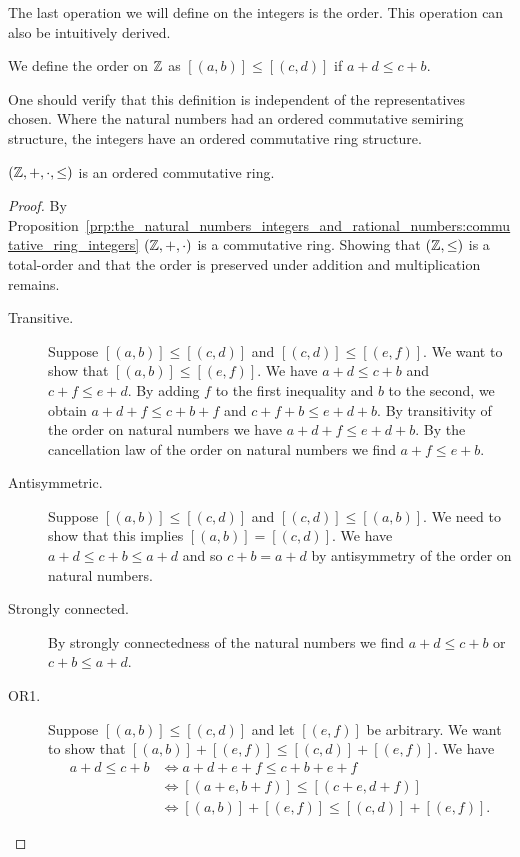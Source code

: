 \documentclass[../main.tex]{subfiles}
\begin{document}
The last operation we will define on the integers is the order. This operation can also be intuitively derived.
\begin{definition}
    We define the order on $\mathbb{Z}$ as $[(a,b)]\leq[(c,d)]$ if $a+d\leq c+b$.
\end{definition}
One should verify that this definition is independent of the representatives chosen. Where the natural numbers had an ordered commutative semiring structure, the integers have an ordered commutative ring structure.
\begin{proposition}\label{prp:the_natural_numbers_integers_and_rational_numbers:ordered_commutative_ring_integers}
    $(\mathbb{Z},+,\cdot,\leq)$ is an ordered commutative ring.
\end{proposition}
\begin{proof}
    By Proposition~\ref{prp:the_natural_numbers_integers_and_rational_numbers:commutative_ring_integers} $(\mathbb{Z},+,\cdot)$ is a commutative ring. Showing that $(\mathbb{Z},\leq)$ is a total-order and that the order is preserved under addition and multiplication remains.
    \begin{description}
        \item[Transitive.] Suppose $[(a,b)]\leq[(c,d)]$ and $[(c,d)]\leq[(e,f)]$. We want to show that $[(a,b)]\leq[(e,f)]$. We have $a+d\leq c+b$ and $c+f\leq e+d$. By adding $f$ to the first inequality and $b$ to the second, we obtain $a+d+f\leq c+b+f$ and $c+f+b\leq e+d+b$. By transitivity of the order on natural numbers we have $a+d+f\leq e+d+b$. By the cancellation law of the order on natural numbers we find $a+f\leq e+b$.
        \item[Antisymmetric.] Suppose $[(a,b)]\leq[(c,d)]$ and $[(c,d)]\leq[(a,b)]$. We need to show that this implies $[(a,b)]=[(c,d)]$. We have $a+d\leq c+b\leq a+d$ and so $c+b=a+d$ by antisymmetry of the order on natural numbers.
        \item[Strongly connected.] By strongly connectedness of the natural numbers we find $a+d\leq c+b$ or $c+b\leq a+d$.
        \item[OR1.] Suppose $[(a,b)]\leq[(c,d)]$ and let $[(e,f)]$ be arbitrary. We want to show that $[(a,b)]+[(e,f)]\leq[(c,d)]+[(e,f)]$. We have
        \begin{align*}
            a+d\leq c+b & \iff a+d+e+f\leq c+b+e+f \\
            & \iff[(a+e,b+f)]\leq[(c+e,d+f)] \\
            & \iff[(a,b)]+[(e,f)]\leq[(c,d)]+[(e,f)].
        \end{align*}

\end{description}
\end{proof}
\end{document}
